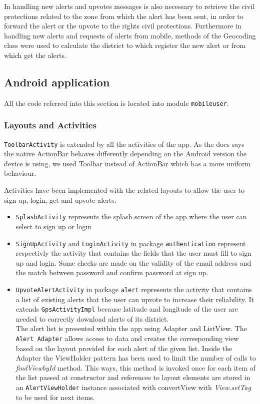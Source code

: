 \documentclass[a4paper,12pt]{report}
\begin{document}
In handling new alerts and upvotes messages is also necessary to retrieve the civil protections related to the zone from which the alert has been sent, in order to forward the alert or the upvote to the rights civil protections. Furthermore in handling new alerts and requests of alerts from mobile, methods of the Geocoding class were used to calculate the district to which register the new alert or from which get the alerts.

\subsection{Android application}

All the code referred into this section is located into module \texttt{mobileuser}.

\subsubsection{Layouts and Activities}
\texttt{ToolbarActivity} is extended by all the activities of the app. As the docs says the native ActionBar behaves differently depending on the Android version the device is using, we used Toolbar instead of ActionBar which has a more uniform behaviour.

Activities have been implemented with the related layouts to allow the user to sign up, login, get and upvote alerts.
\begin{itemize}
\item \texttt{SplashActivity} represents the splash screen of the app where the user can select to sign up or login
\item \texttt{SignUpActivity} and \texttt{LoginActivity} in package \texttt{authentication} represent respectivly the activity that contains the fields that the user must fill to sign up and login. Some checks are made on the validity of the email address and the match between password and confirm password at sign up.
\item \texttt{UpvoteAlertActivity} in package \texttt{alert} represents the activity that contains a list of existing alerts that the user can upvote to increase their reliability. It extends \texttt{GpsActivityImpl} because latitude and longitude of the user are needed to correctly download alerts of its district. \\
The alert list is presented within the app using Adapter and ListView. The \texttt{Alert Adapter} allows access to data and creates the corresponding view based on the layout provided for each alert of the given list. Inside the Adapter the ViewHolder pattern has been used to limit the number of calls to \textit{findViewbyId} method. This ways, this method is invoked once for each item of the list passed at constructor and references to layout elements are stored in an \texttt{AlertViewHolder} instance associated with convertView with \textit{View.setTag} to be used for next items.
\end{itemize}
\end{document}
